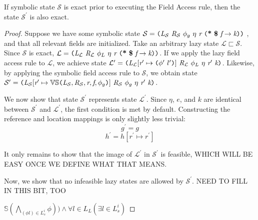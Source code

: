 \begin{lemma}
If symbolic state $\mathcal{S}$ is exact prior to executing the Field Access rule, then the state $\mathcal{S}^\prime $ is also exact.
\end{lemma}

\begin{proof}
Suppose we have some symbolic state  $\mathcal{S} =  \lp \cfgnt{L}_{\mathcal{S}}\ \cfgnt{R}_{\mathcal{S}}\ \phi_g\ \eta\ \cfgnt{r}\ \lp \cfgt{*}\ \cfgt{\$}\ \cfgnt{f} \rightarrow \cfgnt{k}\rp \rp $ , and that all relevant fields are initialized. Take an arbitrary lazy state $\mathcal{L} \sqsubset \mathcal{S}$. Since $\mathcal{S}$ is exact,  $\mathcal{L} = \lp \cfgnt{L}_{\mathcal{L}}\ \cfgnt{R}_{\mathcal{L}}\ \phi_L\ \eta\ \cfgnt{r}\ \lp \cfgt{*}\ \cfgt{\$}\ \cfgnt{f} \rightarrow \cfgnt{k} \rp \rp$. If we apply the lazy field access rule to $\mathcal{L}$, we achieve state $\mathcal{L}^\prime = \lp \cfgnt{L}_{\mathcal{L}} [\cfgnt{r}^\prime \mapsto \lp\phi^\prime\ l^\prime\rp]\ \cfgnt{R}_{\mathcal{L}}\ \phi_L\ \eta\ \cfgnt{r}^\prime\ \cfgnt{k}\rp $. Likewise, by applying the symbolic field access rule to $\mathcal{S}$, we obtain state $\mathcal{S}^\prime = \lp \cfgnt{L}_{\mathcal{S}}[\cfgnt{r}^\prime \mapsto \mathbb{VS}\lp \cfgnt{L}_{\mathcal{S}},\cfgnt{R}_{\mathcal{S}},\cfgnt{r},\cfgnt{f},\phi_g\rp ]\ \cfgnt{R}_{\mathcal{S}}\ \phi_g\ \eta\ \cfgnt{r}^\prime\ \cfgnt{k}\rp $.

We now show that state $\mathcal{S}^\prime$ represents state $\mathcal{L}^\prime $. Since $\eta$, $e$, and $k$ are identical between $\mathcal{S}^\prime$ and $\mathcal{L}^\prime $, the first condition is met by default. Constructing the reference and location mappings is only slightly less trivial: $$g^\prime = g$$ $$h^\prime = h[ r^\prime \mapsto r^\prime]$$ 

It only remains to show that the image of $\mathcal{L}^\prime$ in $\mathcal{S}^\prime$ is feasible, WHICH WILL BE EASY ONCE WE DEFINE WHAT THAT MEANS.

Now, we show that no infeasible lazy states are allowed by $\mathcal{S}^\prime$. NEED TO FILL IN THIS BIT, TOO

$\mathbb{S}(\bigwedge_{(\phi l) \in L_s^i} \phi)) \wedge \forall l \in L_L (\exists l \in L_s^i)$
\end{proof}


